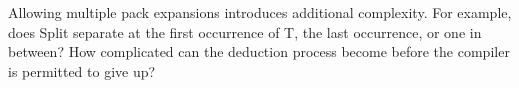 Allowing multiple pack expansions introduces additional complexity. For example, does Split separate at the first occurrence of T, the last occurrence, or one in between? How complicated can the deduction process become before the compiler is permitted to give up?













































